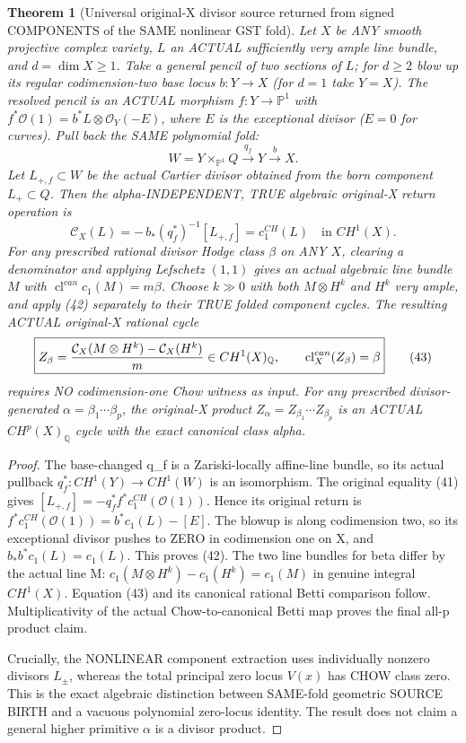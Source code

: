 \documentclass[11pt]{article}
\newtheorem{theorem}{Theorem}[section]
\begin{document}
\begin{theorem}[Universal original-X divisor source returned from signed COMPONENTS of the SAME nonlinear GST fold]
Let $X$ be ANY smooth projective complex variety,
$L$ an ACTUAL sufficiently very ample line bundle,
and $d=\dim X\ge1$.
Take a general pencil of two sections
of $L$; for $d\ge2$ blow up its regular
codimension-two base locus
$b:Y\to X$ (for $d=1$ take $Y=X$).
The resolved pencil is an ACTUAL morphism
$f:Y\to\mathbb P^1$ with
$f^*\mathcal O(1)=b^*L\otimes\mathcal O_Y(-E)$,
where $E$ is the exceptional divisor
($E=0$ for curves).
Pull back the SAME polynomial fold:
\[
 W=Y\times_{\mathbb P^1}Q
       \xrightarrow{\ q_f\ }Y
       \xrightarrow{\ b\ }X.
\]
Let $L_{+,f}\subset W$ be the actual
Cartier divisor obtained from the born
component $L_+\subset Q$.
Then the alpha-INDEPENDENT, TRUE
algebraic original-X return operation is
\[
 \boxed{
 \mathcal C_X(L)=
    -\,b_*(q_f^*)^{-1}[L_{+,f}]
    =c_1^{CH}(L)\quad\text{in }CH^1(X).
 }                                                          \tag{42}
\]
For any prescribed rational divisor Hodge class
$\beta$ on ANY $X$, clearing a denominator
and applying Lefschetz $(1,1)$ gives an actual
algebraic line bundle $M$ with
$\operatorname{cl}^{can}c_1(M)=m\beta$.
Choose $k\gg0$ with both $M\otimes H^k$
and $H^k$ very ample, and apply (42)
separately to their TRUE folded component cycles.
The resulting ACTUAL original-X rational cycle
\[
 \boxed{
 Z_\beta={\mathcal C_X(M\otimes H^k)-
          \mathcal C_X(H^k)\over m}
 \in CH^1(X)_{\mathbb Q},
 \qquad \operatorname{cl}^{can}_X(Z_\beta)=\beta
 }                                                           \tag{43}
\]
requires NO codimension-one Chow witness as input.
For any prescribed divisor-generated
$\alpha=\beta_1\cdots\beta_p$,
the original-X product
$\boxed{Z_\alpha=Z_{\beta_1}\cdots Z_{\beta_p}}$
is an ACTUAL $CH^p(X)_{\mathbb Q}$
cycle with the exact canonical class alpha.
\end{theorem}
\begin{proof}
The base-changed q_f is a Zariski-locally
affine-line bundle, so its actual
pullback $q_f^*:CH^1(Y)\to CH^1(W)$
is an isomorphism.
The original equality (41) gives
$[L_{+,f}]=-q_f^*f^*c_1^{CH}(\mathcal O(1))$.
Hence its original return is
$f^*c_1^{CH}(\mathcal O(1))=b^*c_1(L)-[E]$.
The blowup is along codimension two,
so its exceptional divisor pushes
to ZERO in codimension one on X,
and $b_*b^*c_1(L)=c_1(L)$.
This proves (42).
The two line bundles for beta differ
by the actual line M:
$c_1(M\otimes H^k)-c_1(H^k)=c_1(M)$
in genuine integral $CH^1(X)$.
Equation (43) and its canonical rational
Betti comparison follow. Multiplicativity
of the actual Chow-to-canonical Betti map
proves the final all-p product claim.

Crucially, the NONLINEAR component extraction
uses individually nonzero divisors $L_\pm$,
whereas the total principal zero locus
$V(x)$ has CHOW class zero.
This is the exact algebraic distinction
between SAME-fold geometric SOURCE BIRTH
and a vacuous polynomial zero-locus identity.
The result does not claim a general higher
primitive $\alpha$ is a divisor product.
\end{proof}
\end{document}
